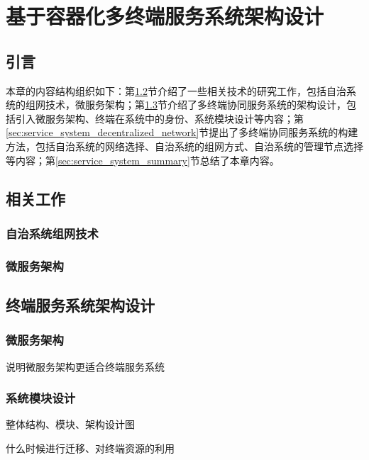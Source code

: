 \chapter{基于容器化多终端服务系统架构设计 }\label{chap:service_system}

\section{引言}

本章的内容结构组织如下：第\ref{sec:service_system_related_work}节介绍了一些相关技术的研究工作，包括自治系统的组网技术，微服务架构；第\ref{sec:service_system_design}节介绍了多终端协同服务系统的架构设计，包括引入微服务架构、终端在系统中的身份、系统模块设计等内容；第\ref{sec:service_system_decentralized_network}节提出了多终端协同服务系统的构建方法，包括自治系统的网络选择、自治系统的组网方式、自治系统的管理节点选择等内容；第\ref{sec:service_system_summary}节总结了本章内容。
\section{相关工作}\label{sec:service_system_related_work}
\subsection{自治系统组网技术}



\subsection{微服务架构}


\section{终端服务系统架构设计}\label{sec:service_system_design}
\subsection{微服务架构}
说明微服务架构更适合终端服务系统
\subsection{系统模块设计}
整体结构、模块、架构设计图

什么时候进行迁移、对终端资源的利用

